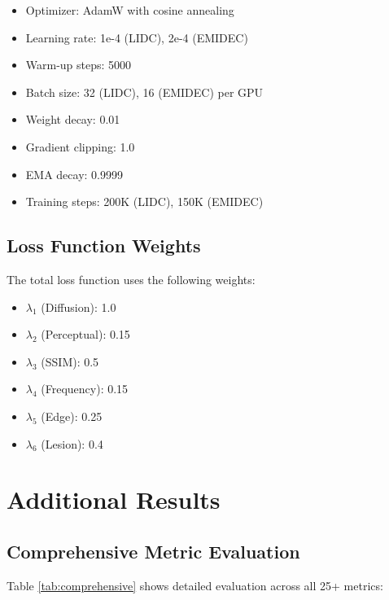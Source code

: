 \documentclass[10pt,twocolumn,letterpaper]{article}
\begin{document}
\begin{itemize}
    \item Optimizer: AdamW with cosine annealing
    \item Learning rate: 1e-4 (LIDC), 2e-4 (EMIDEC)
    \item Warm-up steps: 5000
    \item Batch size: 32 (LIDC), 16 (EMIDEC) per GPU
    \item Weight decay: 0.01
    \item Gradient clipping: 1.0
    \item EMA decay: 0.9999
    \item Training steps: 200K (LIDC), 150K (EMIDEC)
\end{itemize}

\subsection{Loss Function Weights}

The total loss function uses the following weights:
\begin{itemize}
    \item $\lambda_1$ (Diffusion): 1.0
    \item $\lambda_2$ (Perceptual): 0.15
    \item $\lambda_3$ (SSIM): 0.5
    \item $\lambda_4$ (Frequency): 0.15
    \item $\lambda_5$ (Edge): 0.25
    \item $\lambda_6$ (Lesion): 0.4
\end{itemize}

\section{Additional Results}
\label{app:results}

\subsection{Comprehensive Metric Evaluation}

Table \ref{tab:comprehensive} shows detailed evaluation across all 25+ metrics:
\end{document}

